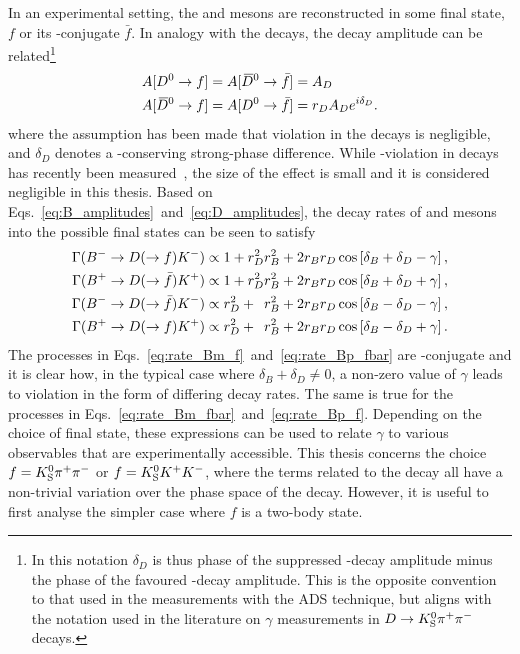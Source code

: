 In an experimental setting, the \Dz and \Dzb mesons are reconstructed in some final state, $f$ or its \CP-conjugate $\bar f$. In analogy with the \Bpm decays, the \D decay amplitude can be related\footnote{In this notation $\delta_D$ is thus phase of the suppressed \D-decay amplitude minus the phase of the favoured \D-decay amplitude. This is the opposite convention to that used in the \lhcb measurements with the ADS technique, but aligns with the notation used in the literature on $\gamma$ measurements in ${D}\rightarrow{\ensuremath{{K}^0_{\mathrm{S}}}}{\ensuremath{{\pi}^+}}{\ensuremath{{\pi}^-}}$ decays.} 
\begin{align}
\begin{split}\label{eq:D_amplitudes}
    A[{{D}^0}\rightarrow f] &= A[{{\kern 0.18em\overline{\kern -0.18em D}}{}^0}\rightarrow \bar f] = A_D \\ 
    A[{{\kern 0.18em\overline{\kern -0.18em D}}{}^0} \rightarrow f] &= A[{{D}^0} \rightarrow \bar f] = r_D A_D e^{i\delta_D}.
\end{split}
\end{align}
where the assumption has been made that \CP violation in the \D decays is negligible, and $\delta_D$ denotes a \CP-conserving strong-phase difference. While \CP-violation in \D decays has recently been measured~\cite{LHCb-PAPER-2019-006}, the size of the effect is small and it is considered negligible in this thesis. Based on Eqs.~\ref{eq:B_amplitudes}~and~\eqref{eq:D_amplitudes}, the decay rates of \Bp and \Bm mesons into the possible final states can be seen to satisfy 
\begin{subequations}\label{eq:rate_equations}
\begin{align}
    \Gamma({{{B}^-}} \rightarrow {\ensuremath{D}}(\rightarrow f){{K}^-}) & \propto 
    1 + r_D^2 r_B^2 + 2 r_B r_D \cos\left[\delta_B + \delta_D - \gamma\right], \label{eq:rate_Bm_f}\\
    \Gamma({{{B}^+}} \rightarrow {\ensuremath{D}}(\rightarrow \bar f){{K}^+}) & \propto 
    1 + r_D^2 r_B^2 + 2 r_B r_D \cos\left[\delta_B + \delta_D + \gamma\right], \label{eq:rate_Bp_fbar}\\
    \Gamma({{{B}^-}} \rightarrow {\ensuremath{D}}(\rightarrow \bar f){{K}^-}) & \propto
    r_D^2 + \phantom{1}r_B^2 + 2 r_B r_D \cos\left[\delta_B - \delta_D - \gamma\right], \label{eq:rate_Bm_fbar}\\
    \Gamma({{{B}^+}} \rightarrow {\ensuremath{D}}(\rightarrow f){{K}^+}) & \propto
    r_D^2 + \phantom{1}r_B^2 + 2 r_B r_D \cos\left[\delta_B - \delta_D + \gamma\right]. \label{eq:rate_Bp_f} 
\end{align}
\end{subequations}
The processes in Eqs.~\eqref{eq:rate_Bm_f}~and~\eqref{eq:rate_Bp_fbar} are \CP-conjugate and it is clear how, in the typical case where $\delta_B+\delta_D\neq 0$,  a non-zero value of $\gamma$ leads to \CP violation in the form of differing decay rates. The same is true for the processes in Eqs.~\eqref{eq:rate_Bm_fbar}~and~\eqref{eq:rate_Bp_f}. Depending on the choice of \D final state, these expressions can be used to relate $\gamma$ to various observables that are experimentally accessible. This thesis concerns the choice $f={{K}^0_{\mathrm{S}}}{{\pi}^+}{{\pi}^-}$ or $f={{K}^0_{\mathrm{S}}}{{K}^+}{{K}^-}$, where the terms related to the \D decay all have a non-trivial variation over the phase space of the decay. However, it is useful to first analyse the simpler case where $f$ is a two-body state. 

